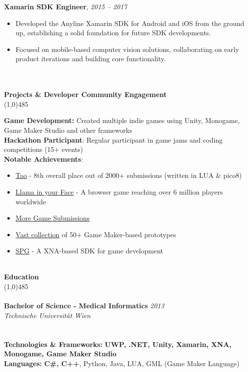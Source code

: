 \documentclass[9pt]{extarticle}
\newcommand\negativespace[1][-0.12cm]{\hspace*{#1}}
\begin{document}
\noindent
{\bf Xamarin SDK Engineer}, \hfill \textit{2015 -- 2017} \\
\begin{itemize}
\setlength\itemsep{0.05em}
\item Developed the Anyline Xamarin SDK for Android and iOS from the ground up, establishing a solid foundation for future SDK developments.
\item Focused on mobile-based computer vision solutions, collaborating on early product iterations and building core functionality.
\end{itemize}

\noindent %
\\
\\
\vspace*{-6pt}
{\negativespace \Large \bf Projects \& Developer Community Engagement}\\
\line(1,0){485}
\\
\noindent

\noindent
\textbf{Game Development:} Created multiple indie games using Unity, Monogame, Game Maker Studio and other frameworks \\
\textbf{Hackathon Participant}: Regular participant in game jams and coding competitions (15+ events) \\
\textbf{Notable Achievements}: \\
\begin{itemize}
\item \href{https://ldjam.com/events/ludum-dare/55/tao}{Tao} - 8th overall place out of 2000+ submissions (written in LUA \& pico8)
\item \href{https://www.newgrounds.com/portal/view/599044}{Llama in your Face} - A browser game reaching over 6 million players worldwide
\item \href{https://ldjam.com/users/leorean/games}{More Game Submissions}
\item \href{https://github.com/leorean/GMStudio}{Vast collection} of 50+ Game Maker-based prototypes
\item \href{https://github.com/leorean/SPG}{SPG} - A XNA-based SDK for game development
\end{itemize}

\noindent %
\\
\vspace*{-6pt}
{\negativespace \Large \bf Education}\\
\line(1,0){485}\\
\\
\noindent
{\bf Bachelor of Science - Medical Informatics} \hfill \textit{2013} \\
\textit{Technische Universität Wien} \\
\\
\\

\noindent
{\bf Technologies \& Frameworks:} \textbf{UWP, .NET, Unity, Xamarin, XNA, Monogame, Game Maker Studio} \\
{\bf Languages:} \textbf{C\#, C++}, Python, Java, LUA, GML (Game Maker Language)
\end{document}
